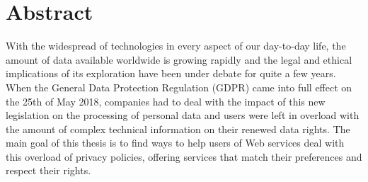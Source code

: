 %

\section*{Abstract}
\label{sec::abstract}


With the widespread of technologies in every aspect of our day-to-day life, the amount of data available worldwide is growing rapidly and the legal and ethical implications of its exploration have been under debate for quite a few years.
When the General Data Protection Regulation (GDPR) came into full effect on the 25th of May 2018, companies had to deal with the impact of this new legislation on the processing of personal data and users were left in overload with the amount of complex technical information on their renewed data rights.
The main goal of this thesis is to find ways to help users of Web services deal with this overload of privacy policies, offering services that match their preferences and respect their rights.

